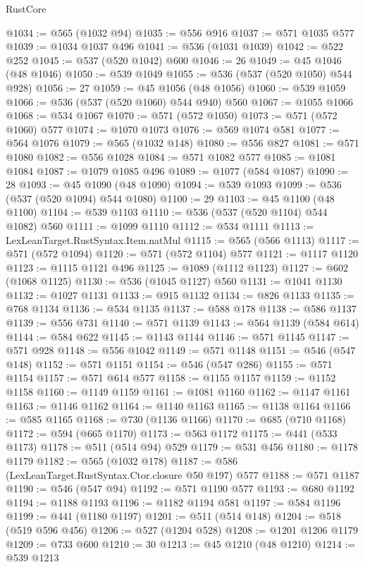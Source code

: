 \begin{lexlean}{RustCore}
\begin{coremodule}
@1034 := @565 (@1032 @94)
@1035 := @556 @916
@1037 := @571 @1035 @577
@1039 := @1034 @1037 @496
@1041 := @536 (@1031 @1039)
@1042 := @522 @252
@1045 := @537 (@520 @1042) @600
@1046 := 26
@1049 := @45 @1046 (@48 @1046)
@1050 := @539 @1049
@1055 := @536 (@537 (@520 @1050) @544 @928)
@1056 := 27
@1059 := @45 @1056 (@48 @1056)
@1060 := @539 @1059
@1066 := @536 (@537 (@520 @1060) @544 @940) @560
@1067 := @1055 @1066
@1068 := @534 @1067
@1070 := @571 (@572 @1050)
@1073 := @571 (@572 @1060) @577
@1074 := @1070 @1073
@1076 := @569 @1074 @581
@1077 := @564 @1076
@1079 := @565 (@1032 @148)
@1080 := @556 @827
@1081 := @571 @1080
@1082 := @556 @1028
@1084 := @571 @1082 @577
@1085 := @1081 @1084
@1087 := @1079 @1085 @496
@1089 := @1077 (@584 @1087)
@1090 := 28
@1093 := @45 @1090 (@48 @1090)
@1094 := @539 @1093
@1099 := @536 (@537 (@520 @1094) @544 @1080)
@1100 := 29
@1103 := @45 @1100 (@48 @1100)
@1104 := @539 @1103
@1110 := @536 (@537 (@520 @1104) @544 @1082) @560
@1111 := @1099 @1110
@1112 := @534 @1111
@1113 := LexLeanTarget.RustSyntax.Item.natMul
@1115 := @565 (@566 @1113)
@1117 := @571 (@572 @1094)
@1120 := @571 (@572 @1104) @577
@1121 := @1117 @1120
@1123 := @1115 @1121 @496
@1125 := @1089 (@1112 @1123)
@1127 := @602 (@1068 @1125)
@1130 := @536 (@1045 @1127) @560
@1131 := @1041 @1130
@1132 := @1027 @1131
@1133 := @915 @1132
@1134 := @826 @1133
@1135 := @768 @1134
@1136 := @534 @1135
@1137 := @588 @178
@1138 := @586 @1137
@1139 := @556 @731
@1140 := @571 @1139
@1143 := @564 @1139 (@584 @614)
@1144 := @584 @622
@1145 := @1143 @1144
@1146 := @571 @1145
@1147 := @571 @928
@1148 := @556 @1042
@1149 := @571 @1148
@1151 := @546 (@547 @148)
@1152 := @571 @1151
@1154 := @546 (@547 @286)
@1155 := @571 @1154
@1157 := @571 @614 @577
@1158 := @1155 @1157
@1159 := @1152 @1158
@1160 := @1149 @1159
@1161 := @1081 @1160
@1162 := @1147 @1161
@1163 := @1146 @1162
@1164 := @1140 @1163
@1165 := @1138 @1164
@1166 := @585 @1165
@1168 := @730 (@1136 @1166)
@1170 := @685 (@710 @1168)
@1172 := @594 (@665 @1170)
@1173 := @563 @1172
@1175 := @441 (@533 @1173)
@1178 := @511 (@514 @94) @529
@1179 := @531 @456
@1180 := @1178 @1179
@1182 := @565 (@1032 @178)
@1187 := @586 (LexLeanTarget.RustSyntax.Ctor.closure @50 @197) @577
@1188 := @571 @1187
@1190 := @546 (@547 @94)
@1192 := @571 @1190 @577
@1193 := @680 @1192
@1194 := @1188 @1193
@1196 := @1182 @1194 @581
@1197 := @584 @1196
@1199 := @441 (@1180 @1197)
@1201 := @511 (@514 @148)
@1204 := @518 (@519 @596 @456)
@1206 := @527 (@1204 @528)
@1208 := @1201 @1206 @1179
@1209 := @733 @600
@1210 := 30
@1213 := @45 @1210 (@48 @1210)
@1214 := @539 @1213

\end{coremodule}
\end{lexlean}
